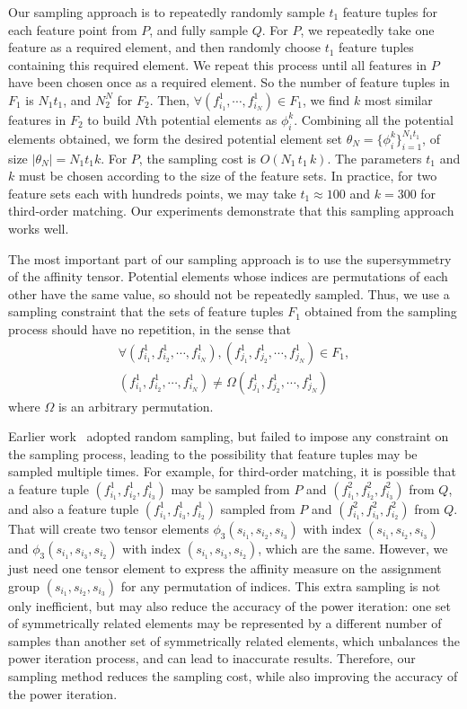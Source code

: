 Our sampling approach is to repeatedly randomly sample $t_1$ feature tuples for each feature point from $P$, and fully sample $Q$.
For $P$, we repeatedly take one feature as a required element, and then randomly choose $t_1$ feature tuples containing this required element.
We repeat this process until all features in $P$ have been chosen once as a required element.
So the number of feature tuples in $F_1$ is $N_1t_1$, and $N_2^N$ for $F_2$.
Then, $\forall (f_{i_1}^1, \cdots, f_{i_N}^1)\in F_1$, we find $k$ most similar features in $F_2$ to build $N$th potential elements as $\phi_i^k$.
Combining all the potential elements obtained, we form the desired potential element set $\theta_N = \{\phi_i^k\}_{i=1}^{N_1 t_1}$, of size $|\theta_N| = N_1 t_1 k$.
For $P$, the sampling cost is $O(N_1\, t_1\,  k)$.
The parameters $t_1$ and $k$ must be chosen according to the size of the feature sets.
In practice, for two feature sets each with hundreds points,
we may take $t_1 \approx 100$ and $k=300$ for third-order matching.
Our experiments demonstrate that this sampling approach works well.


The most important part of our sampling approach is to use the supersymmetry of the affinity tensor. Potential elements whose indices are permutations of each other
have the same value, so should not be repeatedly sampled.
Thus, we use a sampling constraint that the sets of feature tuples $F_1$ obtained from the sampling process should have no repetition, in the sense that
\begin{eqnarray}
\label{equ:noredun2}
\forall (f_{i_1}^1,f_{i_2}^1,\cdots,f_{i_N}^1),(f_{j_1}^1,f_{j_2}^1,\cdots,f_{j_N}^1) \in F_1,\nonumber\\ (f_{i_1}^1,f_{i_2}^1,\cdots,f_{i_N}^1)\neq\Omega(f_{j_1}^1,f_{j_2}^1,\cdots,f_{j_N}^1)
\end{eqnarray}
where $\Omega$ is an arbitrary permutation.

Earlier work~\cite{Duchenne09,Zass08} adopted random sampling,
but failed to impose any constraint on the sampling process,
leading to the possibility that feature tuples may be sampled multiple times.
For example, for third-order matching, it is possible that a feature tuple $(f_{i_1}^1, f_{i_2}^1, f_{i_3}^1)$ may be sampled from $P$ and $(f_{i_1}^2, f_{i_2}^2, f_{i_3}^2)$ from $Q$,
and also a feature tuple $(f_{i_1}^1, f_{i_3}^1, f_{i_2}^1)$ sampled from $P$ and $(f_{i_1}^2, f_{i_3}^2, f_{i_2}^2)$ from $Q$. That will create two tensor elements $\phi_3(s_{i_1}, s_{i_2}, s_{i_3})$ with index $(s_{i_1}, s_{i_2}, s_{i_3})$ and $\phi_3(s_{i_1}, s_{i_3}, s_{i_2})$ with index $(s_{i_1}, s_{i_3}, s_{i_2})$, which are the same. However, we just need one tensor element to express the affinity measure on the assignment group $(s_{i_1}, s_{i_2}, s_{i_3})$ for any permutation of indices.
This extra sampling is not only inefficient, but may also reduce the accuracy of the power iteration: one set of symmetrically related elements  may be represented by a different number of samples than another set of  symmetrically related elements, which unbalances the power iteration process, and can lead to inaccurate results.
Therefore, our sampling method reduces the sampling cost, while also improving the accuracy of the power iteration.
